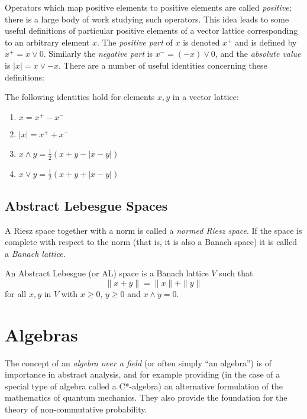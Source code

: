 Operators which map positive elements to positive elements are called \emph{positive}; there is a large body of work studying such operators.
This idea leads to some useful definitions of particular positive elements of a vector lattice corresponding to an arbitrary element $x$. The \emph{positive part} of $x$ is denoted $x^+$ and is defined by $x^+ = x \lor 0$. Similarly the \emph{negative part} is $x^- = (-x)\lor 0$, and the \emph{absolute value} is $|x| = x \lor -x$. There are a number of useful identities concerning these definitions:
\begin{prop}
The following identities hold for elements $x,y$ in a vector lattice:
\begin{enumerate}[\indent(a).]
\item $x = x^+ - x^-$
\item $|x| = x^+ + x^-$
\item $x\land y = \frac{1}{2}(x + y - |x - y|)$
\item $x\lor y =  \frac{1}{2}(x + y + |x - y|)$
\end{enumerate}
\end{prop}

\subsection{Abstract Lebesgue Spaces}
\label{ALspace}

A Riesz space together with a norm is called a \emph{normed Riesz space}. If the space is complete with respect to the norm (that is, it is also a Banach space) it is called a \emph{Banach lattice}.

\begin{defn}
An Abstract Lebesgue (or AL) space is a Banach lattice $V$ such that 
$$\|x + y\| = \|x\| + \|y\|$$
for all $x,y$ in $V$ with $x \ge 0$, $y \ge 0$ and $x\land y = 0$.
\end{defn}

\section{Algebras}
\label{algebras}

The concept of an \emph{algebra over a field} (or often simply ``an algebra'') is of importance in abstract analysis, and for example providing (in the case of a special type of algebra called a C*-algebra) an alternative formulation of the mathematics of quantum mechanics. They also provide the foundation for the theory of non-commutative probability.%

